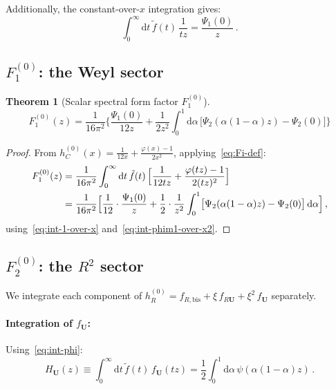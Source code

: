 \documentclass[11pt,a4paper]{article}
\newcommand{\dd}{\mathrm{d}}
\newtheorem{theorem}{Theorem}[section]
\theoremstyle{definition}
\theoremstyle{remark}
\begin{document}
Additionally, the constant-over-$x$ integration gives:
\begin{equation}
  \int_0^\infty \dd t\,\tilde{f}(t)\,\frac{1}{tz}
  = \frac{\Psi_1(0)}{z}\,.
  \label{eq:int-1-over-x}
\end{equation}


\subsection{$F_1^{(0)}$: the Weyl sector}

\begin{theorem}[Scalar spectral form factor $F_1^{(0)}$]
\label{thm:F1}
\begin{equation}
  \boxed{
  F_1^{(0)}(z)
  = \frac{1}{16\pi^2}\Biggl\{
    \frac{\Psi_1(0)}{12z}
    + \frac{1}{2z^2}\int_0^1 \dd\alpha\,
      \bigl[\Psi_2(\alpha(1-\alpha)z) - \Psi_2(0)\bigr]
  \Biggr\}
  }
  \label{eq:F1}
\end{equation}
\end{theorem}

\begin{proof}
From $h_C^{(0)}(x) = \frac{1}{12x} + \frac{\varphi(x)-1}{2x^2}$,
applying~\eqref{eq:Fi-def}:
\begin{align*}
  F_1^{(0)}(z) &= \frac{1}{16\pi^2}\int_0^\infty \dd t\,\tilde{f}(t)\,
  \Bigl[\frac{1}{12tz} + \frac{\varphi(tz)-1}{2(tz)^2}\Bigr]\\
  &= \frac{1}{16\pi^2}\Bigl[
  \frac{1}{12}\cdot\frac{\Psi_1(0)}{z}
  + \frac{1}{2}\cdot\frac{1}{z^2}\int_0^1
  \bigl[\Psi_2(\alpha(1-\alpha)z) - \Psi_2(0)\bigr]\,\dd\alpha
  \Bigr]\,,
\end{align*}
using~\eqref{eq:int-1-over-x} and~\eqref{eq:int-phim1-over-x2}.
\end{proof}


\subsection{$F_2^{(0)}$: the $R^2$ sector}

We integrate each component of $h_R^{(0)} = f_{R,\text{bis}}
+ \xi\,f_{R\mathbf{U}} + \xi^2\,f_{\mathbf{U}}$ separately.

\paragraph{Integration of $f_{\mathbf{U}}$:}
Using~\eqref{eq:int-phi}:
\begin{equation}
  H_{\mathbf{U}}(z) \equiv \int_0^\infty \dd t\,\tilde{f}(t)\,
  f_{\mathbf{U}}(tz)
  = \frac{1}{2}\int_0^1 \dd\alpha\,\psi(\alpha(1-\alpha)z)\,.
  \label{eq:H-U}
\end{equation}
\end{document}
